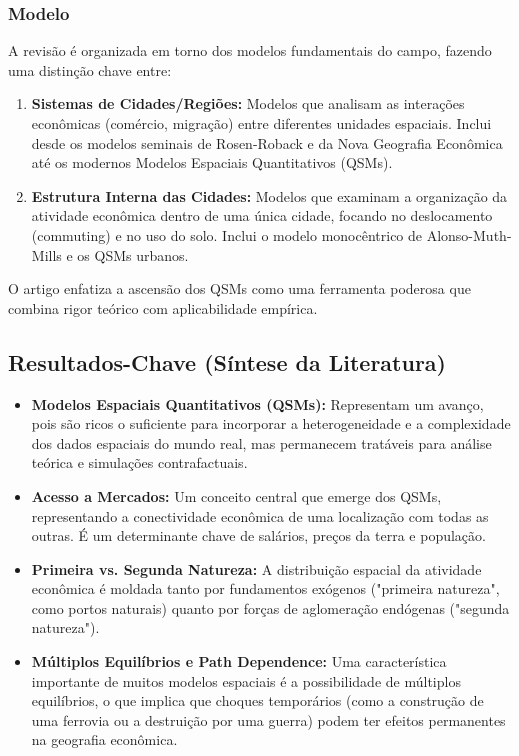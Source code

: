 \documentclass[12pt]{article}
\begin{document}
\subsubsection*{Modelo}
A revisão é organizada em torno dos modelos fundamentais do campo, fazendo uma distinção chave entre:
\begin{enumerate}
    \item \textbf{Sistemas de Cidades/Regiões:} Modelos que analisam as interações econômicas (comércio, migração) entre diferentes unidades espaciais. Inclui desde os modelos seminais de Rosen-Roback e da Nova Geografia Econômica até os modernos Modelos Espaciais Quantitativos (QSMs).
    \item \textbf{Estrutura Interna das Cidades:} Modelos que examinam a organização da atividade econômica dentro de uma única cidade, focando no deslocamento (commuting) e no uso do solo. Inclui o modelo monocêntrico de Alonso-Muth-Mills e os QSMs urbanos.
\end{enumerate}
O artigo enfatiza a ascensão dos QSMs como uma ferramenta poderosa que combina rigor teórico com aplicabilidade empírica.

\subsection*{Resultados-Chave (Síntese da Literatura)}
\begin{itemize}
    \item \textbf{Modelos Espaciais Quantitativos (QSMs):} Representam um avanço, pois são ricos o suficiente para incorporar a heterogeneidade e a complexidade dos dados espaciais do mundo real, mas permanecem tratáveis para análise teórica e simulações contrafactuais.
    \item \textbf{Acesso a Mercados:} Um conceito central que emerge dos QSMs, representando a conectividade econômica de uma localização com todas as outras. É um determinante chave de salários, preços da terra e população.
    \item \textbf{Primeira vs. Segunda Natureza:} A distribuição espacial da atividade econômica é moldada tanto por fundamentos exógenos ("primeira natureza", como portos naturais) quanto por forças de aglomeração endógenas ("segunda natureza").
    \item \textbf{Múltiplos Equilíbrios e Path Dependence:} Uma característica importante de muitos modelos espaciais é a possibilidade de múltiplos equilíbrios, o que implica que choques temporários (como a construção de uma ferrovia ou a destruição por uma guerra) podem ter efeitos permanentes na geografia econômica.
\end{itemize}
\end{document}
